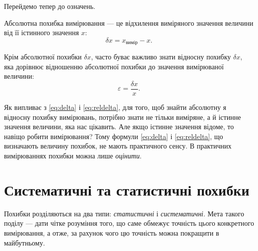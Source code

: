 \documentclass{LabBook}
\begin{document}
Перейдемо тепер до означень.

Абсолютна похибка вимірювання --- це відхилення виміряного значення величини від її істинного значення $x$:
\begin{equation}\label{eq:delta}
	\delta x = x_\text{вимір} - x.
\end{equation}

Крім абсолютної похибки $\delta x$, часто буває важливо знати відносну похибку $\delta x$, яка дорівнює відношенню
абсолютної похибки до значення вимірюваної величини:
\begin{equation}\label{eq:reldelta}
	\varepsilon = \frac{\delta x}{x}.
\end{equation}

Як випливає з \eqref{eq:delta} і \eqref{eq:reldelta}, для того, щоб знайти абсолютну я відносну похибку вимірювань, потрібно знати не тільки виміряне, а й істинне значення величини, яка нас цікавить. Але якщо істинне значення відоме, то навіщо робити вимірювання? Тому формули \eqref{eq:delta} і \eqref{eq:reldelta}, що визначають величину похибок, не мають практичного сенсу. В практичних вимірюваннях похибки можна лише \emph{оцінити}.


%
%
%

\chapter{Систематичні та статистичні похибки}


Похибки розділяються на два типи: \emph{статистичні} і \emph{систематичні}. Мета такого поділу --- дати чітке розуміння того, що саме обмежує точність цього конкретного вимірювання, а отже, за рахунок чого цю точність можна покращити в майбутньому.
\end{document}
